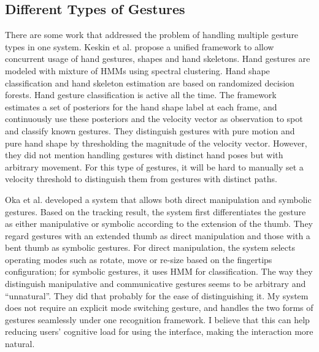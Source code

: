 \subsection{Different Types of Gestures}
There are some work that addressed the problem of handling multiple gesture
types in one system. Keskin et al. \cite{keskin12} propose a unified framework
to allow concurrent usage of hand gestures, shapes and hand skeletons. Hand gestures are modeled with mixture of HMMs using spectral clustering. Hand shape classification and
hand skeleton estimation are based on randomized decision forests. Hand
gesture classification is active all the time. The framework estimates a set of
posteriors for the hand shape label at each frame, and continuously use these
posteriors and the velocity vector as observation to spot and classify known
gestures. They distinguish gestures with pure motion and pure hand shape by
thresholding the magnitude of the velocity vector. However, they did not mention
handling gestures with distinct hand poses but with arbitrary movement. For this
type of gestures, it will be hard to manually set a velocity threshold to
distinguish them from gestures with distinct paths.

Oka et al. \cite{Oka02} developed a system that
allows both direct manipulation and symbolic gestures. Based on the tracking
result, the system first differentiates the gesture as either manipulative or symbolic 
according to the extension of the thumb. They regard gestures with an extended 
thumb as direct manipulation and those with a bent thumb as symbolic gestures. 
For direct manipulation, the system selects operating modes such as rotate, 
move or re-size based on the fingertips configuration; for symbolic gestures, it 
uses HMM for classification. The way they distinguish manipulative and 
communicative gestures seems to be arbitrary and ``unnatural''. They did that 
probably for the ease of distinguishing it.
My system does not
require an explicit mode switching gesture, and handles the two forms of
gestures seamlessly under one recognition framework. I believe that this can
help reducing users' cognitive load for using the interface, making the interaction more natural.

